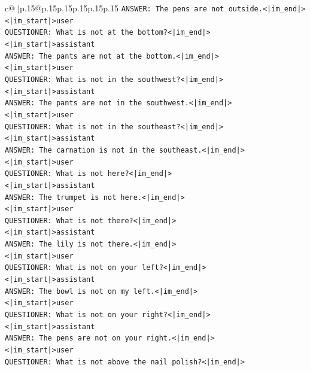 \documentclass{article}
\begin{document}
{\begin{supertabular}{c@{$\;$}|p{.15\linewidth}@{}p{.15\linewidth}p{.15\linewidth}p{.15\linewidth}p{.15\linewidth}p{.15\linewidth}}
{{{\texttt{ANSWER: The pens are not outside.<|im\_end|>} \\
\texttt{<|im\_start|>user} \\
\texttt{QUESTIONER: What is not at the bottom?<|im\_end|>} \\
\texttt{<|im\_start|>assistant} \\
\texttt{ANSWER: The pants are not at the bottom.<|im\_end|>} \\
\texttt{<|im\_start|>user} \\
\texttt{QUESTIONER: What is not in the southwest?<|im\_end|>} \\
\texttt{<|im\_start|>assistant} \\
\texttt{ANSWER: The pants are not in the southwest.<|im\_end|>} \\
\texttt{<|im\_start|>user} \\
\texttt{QUESTIONER: What is not in the southeast?<|im\_end|>} \\
\texttt{<|im\_start|>assistant} \\
\texttt{ANSWER: The carnation is not in the southeast.<|im\_end|>} \\
\texttt{<|im\_start|>user} \\
\texttt{QUESTIONER: What is not here?<|im\_end|>} \\
\texttt{<|im\_start|>assistant} \\
\texttt{ANSWER: The trumpet is not here.<|im\_end|>} \\
\texttt{<|im\_start|>user} \\
\texttt{QUESTIONER: What is not there?<|im\_end|>} \\
\texttt{<|im\_start|>assistant} \\
\texttt{ANSWER: The lily is not there.<|im\_end|>} \\
\texttt{<|im\_start|>user} \\
\texttt{QUESTIONER: What is not on your left?<|im\_end|>} \\
\texttt{<|im\_start|>assistant} \\
\texttt{ANSWER: The bowl is not on my left.<|im\_end|>} \\
\texttt{<|im\_start|>user} \\
\texttt{QUESTIONER: What is not on your right?<|im\_end|>} \\
\texttt{<|im\_start|>assistant} \\
\texttt{ANSWER: The pens are not on your right.<|im\_end|>} \\
\texttt{<|im\_start|>user} \\
\texttt{QUESTIONER: What is not above the nail polish?<|im\_end|>} \\
}}}
\end{supertabular}}
\end{document}
